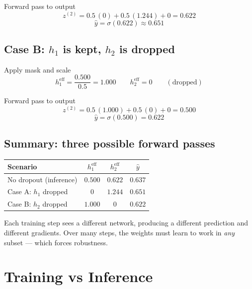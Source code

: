 \documentclass[12pt, a4paper]{article}
\newif\ifstudentmode
\newcommand{\sol}[2][6cm]{%
  \ifstudentmode\underline{\hspace{#1}}\else{#2}\fi}
\theoremstyle{definition}
\newcommand{\yhat}{\hat{y}}
\newcommand{\sigmoid}{\sigma}
\begin{document}
\begin{stepbox}{Forward pass to output}
\[
  z^{(2)} = 0.5\,(0) + 0.5\,(1.244) + 0 = \sol[3cm]{0.622}
\]
\[
  \yhat = \sigmoid(0.622) \approx \sol[3cm]{0.651}
\]
\end{stepbox}

\subsection{Case B: $h_1$ is kept, $h_2$ is dropped}

\begin{stepbox}{Apply mask and scale}
\[
  h_1^{\text{eff}} = \frac{0.500}{0.5} = \sol[3cm]{1.000}
  \qquad
  h_2^{\text{eff}} = 0 \qquad (\text{dropped})
\]
\end{stepbox}

\begin{stepbox}{Forward pass to output}
\[
  z^{(2)} = 0.5\,(1.000) + 0.5\,(0) + 0 = \sol[3cm]{0.500}
\]
\[
  \yhat = \sigmoid(0.500) = \sol[3cm]{0.622}
\]
\end{stepbox}

\subsection{Summary: three possible forward passes}

\begin{center}
\renewcommand{\arraystretch}{1.4}
\begin{tabular}{lccc}
\toprule
Scenario & $h_1^{\text{eff}}$ & $h_2^{\text{eff}}$ & $\yhat$ \\
\midrule
No dropout (inference) & $0.500$ & $0.622$ & $0.637$ \\
Case A: $h_1$ dropped  & $0$     & $1.244$ & $0.651$ \\
Case B: $h_2$ dropped  & $1.000$ & $0$     & $0.622$ \\
\bottomrule
\end{tabular}
\end{center}

Each training step sees a different network, producing a different
prediction and different gradients.
Over many steps, the weights must learn to work in \emph{any} subset ---
which forces robustness.

\section{Training vs Inference}
\end{document}
